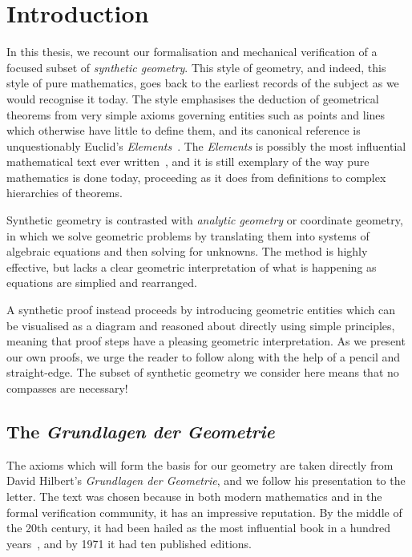 \chapter{Introduction}\label{chapter:Introduction}
In this thesis, we recount our formalisation and mechanical verification of a focused subset of \emph{synthetic geometry}. This style of geometry, and indeed, this style of pure mathematics, goes back to the earliest records of the subject as we would recognise it today. The style emphasises the deduction of geometrical theorems from very simple axioms governing entities such as points and lines which otherwise have little to define them, and its canonical reference is unquestionably Euclid's \emph{Elements}~\cite{HeathElements}. The \emph{Elements} is possibly the most influential mathematical text ever written~\cite{BoyerEuclidInfluence}, and it is still exemplary of the way pure mathematics is done today, proceeding as it does from definitions to complex hierarchies of theorems.

Synthetic geometry is contrasted with \emph{analytic geometry} or coordinate geometry, in which we solve geometric problems by translating them into systems of algebraic equations and then solving for unknowns. The method is highly effective, but lacks a clear geometric interpretation of what is happening as equations are simplied and rearranged.

A synthetic proof instead proceeds by introducing geometric entities which can be visualised as a diagram and reasoned about directly using simple principles, meaning that proof steps have a pleasing geometric interpretation. As we present our own proofs, we urge the reader to follow along with the help of a pencil and straight-edge. The subset of synthetic geometry we consider here means that no compasses are necessary!

\section{The \emph{Grundlagen der Geometrie}}
The axioms which will form the basis for our geometry are taken directly from David Hilbert's \emph{Grundlagen der Geometrie}, and we follow his presentation to the letter. The text was chosen because in both modern mathematics and in the formal verification community, it has an impressive reputation. By the middle of the 20th century, it had been hailed as the most influential book in a hundred years~\cite{BirkhoffHilbertInfluence}, and by 1971 it had ten published editions. 

